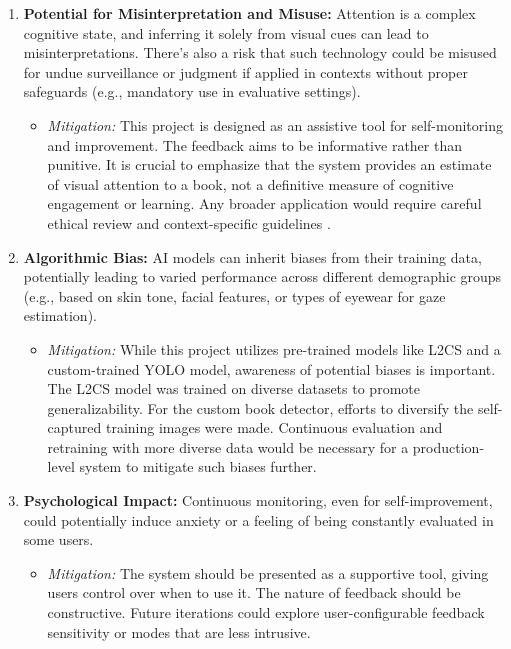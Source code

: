\begin{enumerate}
    \item \textbf{Potential for Misinterpretation and Misuse:} Attention is a complex cognitive state, and inferring it solely from visual cues can lead to misinterpretations. There's also a risk that such technology could be misused for undue surveillance or judgment if applied in contexts without proper safeguards (e.g., mandatory use in evaluative settings).
    \begin{itemize}
        \item \textit{Mitigation:} This project is designed as an assistive tool for self-monitoring and improvement. The feedback aims to be informative rather than punitive. It is crucial to emphasize that the system provides an estimate of visual attention to a book, not a definitive measure of cognitive engagement or learning. Any broader application would require careful ethical review and context-specific guidelines \cite{Gupta_EthicalAIEd_2024}.
    \end{itemize}

    \item \textbf{Algorithmic Bias:} AI models can inherit biases from their training data, potentially leading to varied performance across different demographic groups (e.g., based on skin tone, facial features, or types of eyewear for gaze estimation).
    \begin{itemize}
        \item \textit{Mitigation:} While this project utilizes pre-trained models like L2CS and a custom-trained YOLO model, awareness of potential biases is important. The L2CS model was trained on diverse datasets to promote generalizability. For the custom book detector, efforts to diversify the self-captured training images were made. Continuous evaluation and retraining with more diverse data would be necessary for a production-level system to mitigate such biases further.
    \end{itemize}

    \item \textbf{Psychological Impact:} Continuous monitoring, even for self-improvement, could potentially induce anxiety or a feeling of being constantly evaluated in some users.
    \begin{itemize}
        \item \textit{Mitigation:} The system should be presented as a supportive tool, giving users control over when to use it. The nature of feedback should be constructive. Future iterations could explore user-configurable feedback sensitivity or modes that are less intrusive.
    \end{itemize}


\end{enumerate}
